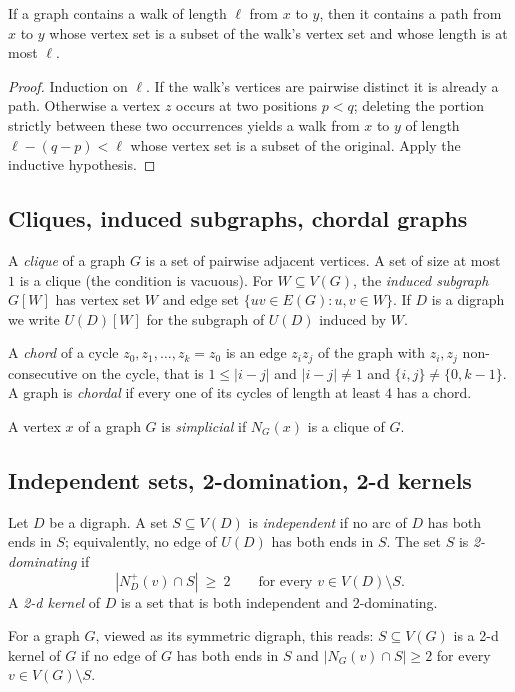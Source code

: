 \documentclass[11pt]{article}
\numberwithin{equation}{section}
\theoremstyle{plain}
\newcommand{\V}{V}
\newcommand{\Np}{N^{+}}
\newcommand{\und}{U}                       %
\begin{document}
\begin{lemma}\label{lem:walkpath}
If a graph contains a walk of length $\ell$ from $x$ to $y$, then it contains a path from
$x$ to $y$ whose vertex set is a subset of the walk's vertex set and whose length is at
most $\ell$.
\end{lemma}

\begin{proof}
Induction on $\ell$. If the walk's vertices are pairwise distinct it is already a path.
Otherwise a vertex $z$ occurs at two positions $p<q$; deleting the portion strictly
between these two occurrences yields a walk from $x$ to $y$ of length
$\ell-(q-p)<\ell$ whose vertex set is a subset of the original. Apply the inductive
hypothesis.
\end{proof}

\subsection{Cliques, induced subgraphs, chordal graphs}

A \emph{clique} of a graph $G$ is a set of pairwise adjacent vertices. A set of size at
most $1$ is a clique (the condition is vacuous). For $W\subseteq\V(G)$, the
\emph{induced subgraph} $G[W]$ has vertex set $W$ and edge set
$\{uv\in E(G):u,v\in W\}$. If $D$ is a digraph we write $\und(D)[W]$ for the subgraph of
$\und(D)$ induced by $W$.

A \emph{chord} of a cycle $z_0,z_1,\dots,z_k=z_0$ is an edge $z_iz_j$ of the graph with
$z_i,z_j$ non-consecutive on the cycle, that is $1\le|i-j|$ and $|i-j|\neq 1$ and
$\{i,j\}\neq\{0,k-1\}$. A graph is \emph{chordal} if every one of its cycles of length at
least $4$ has a chord.

A vertex $x$ of a graph $G$ is \emph{simplicial} if $N_G(x)$ is a clique of $G$.

\subsection{Independent sets, 2-domination, 2-d kernels}

Let $D$ be a digraph. A set $S\subseteq\V(D)$ is \emph{independent} if no arc of $D$ has
both ends in $S$; equivalently, no edge of $\und(D)$ has both ends in $S$. The set $S$ is
\emph{2-dominating} if
\[
  |\Np_D(v)\cap S|\ \ge\ 2 \qquad\text{for every } v\in\V(D)\setminus S .
\]
A \emph{2-d kernel} of $D$ is a set that is both independent and 2-dominating.

For a graph $G$, viewed as its symmetric digraph, this reads: $S\subseteq\V(G)$ is a
2-d kernel of $G$ if no edge of $G$ has both ends in $S$ and $|N_G(v)\cap S|\ge 2$ for
every $v\in\V(G)\setminus S$.
\end{document}
